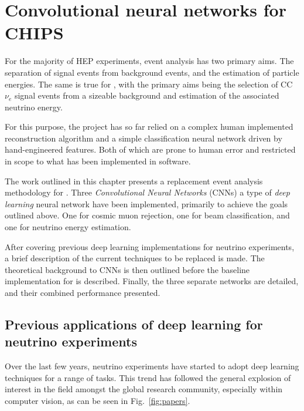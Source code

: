 \chapter{Convolutional neural networks for CHIPS} %
\label{chap:cvn} %

For the majority of HEP experiments, event analysis has two primary aims. The separation of signal
events from background events, and the estimation of particle energies. The same is true for
\chips, with the primary aims being the selection of CC $\nu_{e}$ signal events from a sizeable
background and estimation of the associated neutrino energy.

For this purpose, the \chips project has so far relied on a complex human implemented
reconstruction algorithm and a simple classification neural network driven by hand-engineered
features. Both of which are prone to human error and restricted in scope to what has been
implemented in software.

The work outlined in this chapter presents a replacement event analysis methodology for \chips.
Three \emph{Convolutional Neural Networks} (CNNs) a type of \emph{deep learning} neural network
have been implemented, primarily to achieve the goals outlined above. One for cosmic muon
rejection, one for beam classification, and one for neutrino energy estimation.

After covering previous deep learning implementations for neutrino experiments, a brief
description of the current techniques to be replaced is made. The theoretical background to CNNs
is then outlined before the baseline implementation for \chips is described. Finally, the three
separate networks are detailed, and their combined performance presented.

\section{Previous applications of deep learning for neutrino experiments} %
\label{sec:cvn_previous} %

Over the last few years, neutrino experiments have started to adopt deep learning techniques for a
range of tasks. This trend has followed the general explosion of interest in the field amongst the
global research community, especially within computer vision, as can be seen in
Fig.~\ref{fig:papers}.

